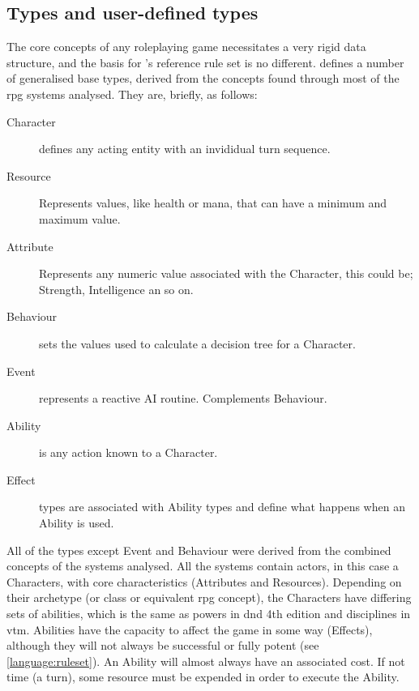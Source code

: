 \subsection{Types and user-defined types}
\label{language:types}
The core concepts of any roleplaying game necessitates a very rigid data structure, and the basis for \langname{}'s reference rule set is no different.
\langname{} defines a number of generalised base types, derived from the concepts found through most of the \ac{rpg} systems analysed. They are, briefly, as follows:
\begin{description}
	\item[Character] defines any acting entity with an invididual turn sequence.
	\item[Resource] Represents values, like health or mana, that can have a minimum and maximum value.
	\item[Attribute] Represents any numeric value associated with the Character, this could be; Strength, Intelligence an so on.
	\item[Behaviour] sets the values used to calculate a decision tree for a Character.
	\item[Event] represents a reactive AI routine. Complements Behaviour.
	\item[Ability] is any action known to a Character.
	\item[Effect] types are associated with Ability types and define what happens when an Ability is used.
\end{description} 

All of the types except Event and Behaviour were derived from the combined concepts of the systems analysed. All the systems contain actors, in this case a Characters, with core characteristics (Attributes and Resources). Depending on their archetype (or class or equivalent \ac{rpg} concept), the Characters have differing sets of abilities, which is the same as powers in \ac{dnd} 4th edition and disciplines in \ac{vtm}.
Abilities have the capacity to affect the game in some way (Effects), although they will not always be successful or fully potent (see \vref{language:ruleset}). An Ability will almost always have an associated cost. If not time (a turn), some resource must be expended in order to execute the Ability. %

